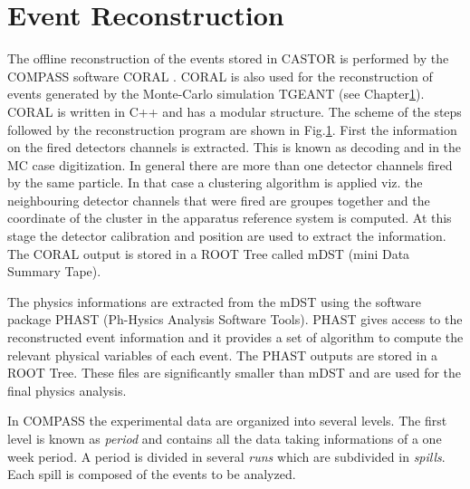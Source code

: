 \section{Event Reconstruction}

The offline reconstruction of the events stored in CASTOR is performed by the COMPASS software CORAL \cite{}. CORAL is also used for the reconstruction of events generated by the Monte-Carlo
simulation TGEANT (see Chapter\ref{}). CORAL is written in C++ and has a modular structure. The scheme of the steps followed by the reconstruction program are shown in Fig.\ref{}. First the
information on the fired detectors channels is extracted. This is known as decoding and in the MC case digitization. In general there are more than one detector channels fired by the same
particle. In that case a clustering algorithm is applied viz. the neighbouring detector channels that were fired are groupes together and the coordinate of the cluster in the apparatus reference
system is computed. At this stage the detector calibration and position are used to extract the information. The CORAL output is stored in a ROOT Tree called mDST (mini Data Summary Tape).

The physics informations are extracted from the mDST using the software package PHAST (Ph-Hysics Analysis Software Tools). PHAST gives access to the reconstructed event information and it provides
a set of algorithm to compute the relevant physical variables of each event. The PHAST outputs are stored in a ROOT Tree. These files are significantly smaller than mDST and are used for the final
physics analysis.

In COMPASS the experimental data are organized into several levels. The first level is known as \textit{period} and contains all the data taking informations of a one week period. A period is
divided in several \textit{runs} which are subdivided in \textit{spills}. Each spill is composed of the events to be analyzed.
